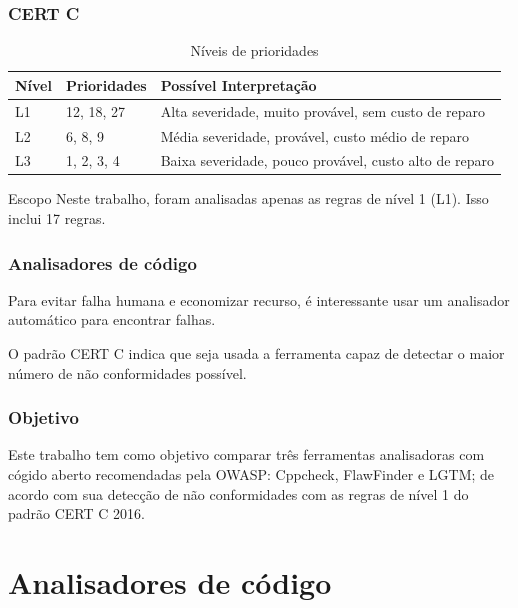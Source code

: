 \documentclass{beamer}
\newcommand{\hl}[1]{{\color{white}\colorbox{green-hl}{#1}}}
\begin{document}
\begin{frame}
  \frametitle{CERT C}
  \begin{table}[!h]
    \hspace*{-16px}
    \begin{tabular}{@{}lll@{}}
      Nível & Prioridades & Possível Interpretação \\\toprule
      L1 & 12, 18, 27 & Alta severidade, muito provável, sem custo de reparo\\
      L2 & 6, 8, 9 & Média severidade, provável, custo médio de reparo\\
      L3 & 1, 2, 3, 4 & Baixa severidade, pouco provável, custo alto de reparo\\
    \end{tabular}
    \caption{Níveis de prioridades}
    \label{table:prioriades}
  \end{table}\pause

  \begin{block}{Escopo}
    Neste trabalho, foram analisadas apenas as regras de nível 1 (L1). Isso inclui 17 regras.
 \end{block}

\end{frame}

\begin{frame}
  \frametitle{Analisadores de código}

  Para evitar falha humana e economizar recurso, é interessante usar um analisador automático para encontrar falhas.\\\medskip

  O padrão CERT C indica que seja usada a ferramenta capaz de detectar o maior número de não conformidades possível.

\end{frame}

\begin{frame}
  \frametitle{Objetivo}

  Este trabalho tem como objetivo \hl{comparar} três ferramentas analisadoras com cógido aberto recomendadas pela OWASP: Cppcheck, FlawFinder e LGTM; de acordo com sua \hl{detecção de não conformidades} com as regras de nível 1 do padrão CERT C 2016.

\end{frame}

\section{Analisadores de código}
\end{document}
